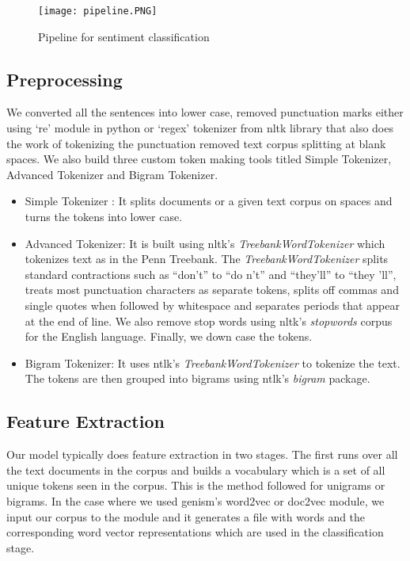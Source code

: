 \documentclass[a4paper,26pt]{article}
\begin{document}
\begin{figure}[h]
\centerline{\texttt{[image: pipeline.PNG]}
}
\caption{Pipeline for sentiment classification}
 \label{fig:pipeline}
\end{figure}

\subsection{Preprocessing}
We converted all the sentences into lower case, removed punctuation marks either using `re' module in python or `regex' tokenizer from nltk library that also does the work of tokenizing the punctuation removed text corpus splitting at blank spaces. We also build three custom token making tools titled Simple Tokenizer, Advanced Tokenizer and Bigram Tokenizer. 

\begin{itemize}
    \item Simple Tokenizer : It splits documents or a given text corpus on spaces and  turns the tokens into lower case.
    \item Advanced Tokenizer: It is built using nltk's \textit{TreebankWordTokenizer} which tokenizes text as in the Penn Treebank. The \textit{TreebankWordTokenizer} splits standard contractions such as ``don't'' to ``do n't'' and ``they'll'' to ``they 'll'', treats most punctuation characters as separate tokens, splits off commas and single quotes when followed by whitespace and separates periods that appear at the end of line. We also remove stop words using nltk's \textit{stopwords} corpus for the English language. Finally, we down case the tokens. 
    \item Bigram Tokenizer: It uses ntlk's \textit{TreebankWordTokenizer} to tokenize the text. The tokens are then grouped into bigrams using ntlk's \textit{bigram} package.
\end{itemize}

\subsection{Feature Extraction}
Our model typically does feature extraction in two stages. The first runs over all the text documents in the corpus and builds a vocabulary which is a set of all unique tokens seen in the corpus. This is the method followed for unigrams or bigrams. In the case where we used genism's word2vec or doc2vec module, we input our corpus to the module and it generates a file with words and the corresponding word vector representations which are used in the classification stage. 
\end{document}
